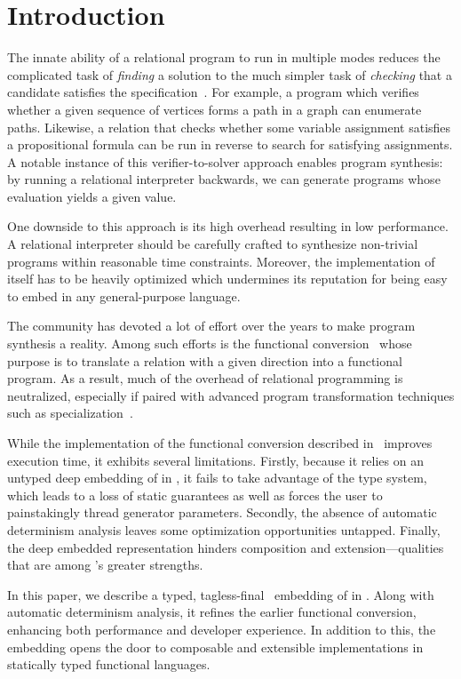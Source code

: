 \section{Introduction}

The innate ability of a relational program to run in multiple modes reduces the complicated task of \emph{finding} a solution to the much simpler task of \emph{checking} that a candidate satisfies the specification~\cite{lozov2019relational}. 
For example, a program which verifies whether a given sequence of vertices forms a path in a graph can enumerate paths. 
Likewise, a relation that checks whether some variable assignment satisfies a propositional formula can be run in reverse to search for satisfying assignments. 
A notable instance of this verifier-to-solver approach enables program synthesis: by running a relational interpreter backwards, we can generate programs whose evaluation yields a given value. 

One downside to this approach is its high overhead resulting in low performance. 
A relational interpreter should be carefully crafted to synthesize non-trivial programs within reasonable time constraints. 
Moreover, the implementation of \mk itself has to be heavily optimized which undermines its reputation for being easy to embed in any general-purpose language. 

The \mk community has devoted a lot of effort over the years to make program synthesis a reality.  
Among such efforts is the functional conversion~\cite{engel2023translation} whose purpose is to translate a relation with a given direction into a functional program. 
As a result, much of the overhead of relational programming is neutralized, especially if paired with advanced program transformation techniques such as specialization~\cite{verbitskaia2021deduction}. 

While the implementation of the functional conversion described in~\cite{engel2023translation} improves execution time, it exhibits several limitations. 
Firstly, because it relies on an untyped deep embedding of \mk in \haskell, it fails to take advantage of the \haskell type system, which leads to a loss of static guarantees as well as forces the user to painstakingly thread generator parameters. 
Secondly, the absence of automatic determinism analysis leaves some optimization opportunities untapped. 
Finally, the deep embedded representation hinders composition and extension---qualities that are among \mk's greater strengths. 

In this paper, we describe a typed, tagless-final~\cite{carette2009finally} embedding of \mk in \haskell. 
Along with automatic determinism analysis, it refines the earlier functional conversion, enhancing both performance and developer experience.
In addition to this, the embedding opens the door to composable and extensible \mk implementations in statically typed functional languages.
